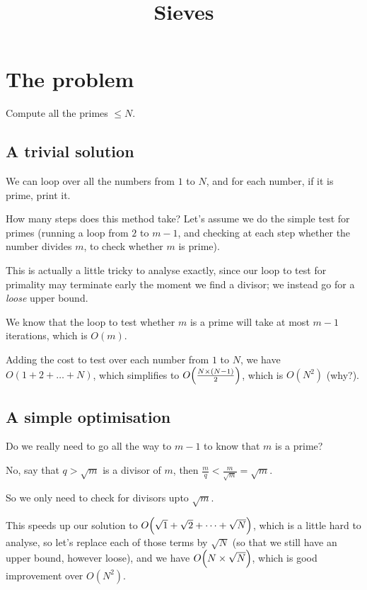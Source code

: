\documentclass{article}
\title{Sieves}
\DeclarePairedDelimiter{\braces}{(}{)}
\begin{document}
\maketitle


\section{The problem}
Compute all the primes $\leq N$.

\subsection{A trivial solution}
We can loop over all the numbers from $1$ to $N$, and for each
number, if it is prime, print it.

How many steps does this method take?
Let's assume we do the simple test for primes (running a loop from
$2$ to $m - 1$, and checking at each step whether the number divides $m$,
to check whether $m$ is prime).

This is actually a little tricky to analyse exactly, since our loop
to test for primality may terminate early the moment we find a divisor; 
we instead go for a \emph{loose} upper bound.

We know that the loop to test whether $m$ is a prime will take at most
$m - 1$ iterations, which is $O(m)$.

Adding the cost to test over each number from $1$ to $N$, we have
$O(1 + 2 + \dots + N)$, which simplifies to $O\braces*{\frac{N\times(N - 1)}2}$,
which is $O(N^2)$ (why?).

\subsection{A simple optimisation}
Do we really need to go all the way to $m - 1$ to know that $m$ is
a prime?

No, say that $q > \sqrt{m}$ is a divisor of $m$, 
then $\frac mq < \frac m{\sqrt{m}} = \sqrt{m}$.

So we only need to check for divisors upto $\sqrt{m}$.

This speeds up our solution to
$O\braces*{\sqrt{1} + \sqrt{2} + \dots + \sqrt{N}}$, which is a
little hard to analyse, so let's replace each of those terms by
$\sqrt{N}$ (so that we still have an upper bound, however loose),
and we have $O\braces*{N \times \sqrt{N}}$, which is good
improvement over $O(N^2)$.
\end{document}
